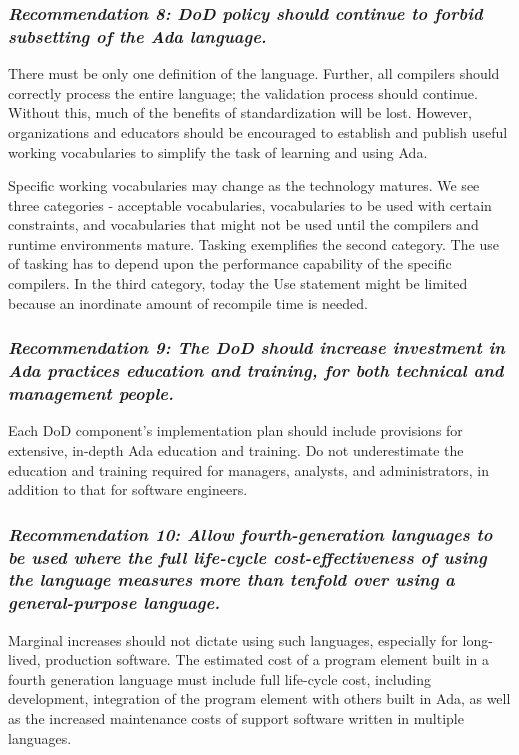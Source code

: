 \documentclass[12pt,final]{article}
\begin{document}
\label{rec:8}
\subsubsection*{\textit{Recommendation 8: DoD policy should continue to forbid subsetting of the Ada
language.}}

There must be only one definition of the language. Further, all compilers
should correctly process the entire language; the validation process should
continue. Without this, much of the benefits of standardization will be lost.
However, organizations and educators should be encouraged to establish and
publish useful working vocabularies to simplify the task of learning and using
Ada.

Specific working vocabularies may change as the technology matures. We see
three categories - acceptable vocabularies, vocabularies to be used with
certain constraints, and vocabularies that might not be used until the
compilers and runtime environments mature. Tasking exemplifies the second
category. The use of tasking has to depend upon the performance capability of
the specific compilers. In the third category, today the Use statement might be
limited because an inordinate amount of recompile time is needed.

\label{rec:9}
\subsubsection*{\textit{Recommendation 9: The DoD should increase investment in
Ada practices education and training, for both technical and management
people.}}

Each DoD component’s implementation plan should include provisions for
extensive, in-depth Ada education and training. Do not underestimate the
education and training required for managers, analysts, and administrators, in
addition to that for software engineers.

\label{rec:10}
\subsubsection*{\textit{Recommendation 10: Allow fourth-generation languages to
be used where the full life-cycle cost-effectiveness of using the language
measures more than tenfold over using a general-purpose language.}}

Marginal increases should not dictate using such languages, especially for
long-lived, production software. The estimated cost of a program element built
in a fourth generation language must include full life-cycle cost, including
development, integration of the program element with others built in Ada, as
well as the increased maintenance costs of support software written in multiple
languages.
\end{document}
